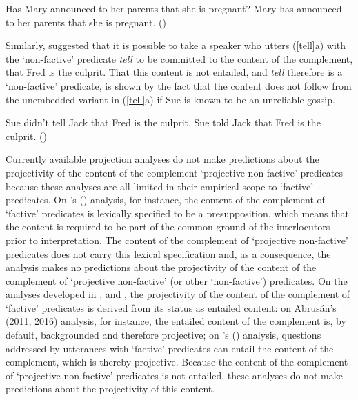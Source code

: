 \documentclass[11pt,fleqn]{article}
\newcommand{\6}{\mbox{$[\hspace*{-.6mm}[$}}
\newcommand{\9}{\mbox{$]\hspace*{-.6mm}]$}}
\newcommand{\citetpos}[1]{\citeauthor{#1}'s (\citeyear{#1})}
\begin{document}
\begin{exe}
\ex\label{announce2} 
\begin{xlist}
\ex Has Mary announced to her parents that she is pregnant? 
\ex Mary has announced to her parents that she is pregnant. \hfill (\citealt[139]{schlenker10})
\end{xlist}
\end{exe}
Similarly, \citet{spector-egre2015} suggested that it is possible to take a speaker who utters (\ref{tell}a) with the `non-factive' predicate {\em tell}  to be committed to the content of the complement, that Fred is the culprit. That this content is not entailed, and {\em tell} therefore is a `non-factive' predicate, is shown by the fact that the content does not follow from the unembedded variant in (\ref{tell}a) if Sue is known to be an unreliable gossip.

\begin{exe}
\ex\label{tell}
\begin{xlist}
\ex Sue didn't tell Jack that Fred is the culprit. 
\ex Sue told Jack that Fred is the culprit. \hfill (\citealt[1739]{spector-egre2015})
\end{xlist}
\end{exe}

Currently available projection analyses do not make predictions about the projectivity of the content of the complement `projective non-factive' predicates because these analyses are all limited in their empirical scope to `factive' predicates. On \citetpos{heim83} analysis, for instance, the content of the complement of `factive' predicates is lexically specified to be a presupposition, which means that the content is required to be part of the common ground of the interlocutors prior to interpretation. The content of the complement of `projective non-factive' predicates does not carry this lexical specification and, as a consequence, the analysis makes no predictions about the projectivity of the content of the complement of `projective non-factive' (or other `non-factive') predicates. On the analyses developed in \citealt{abrusan2011,abrusan2016}, \citealt{romoli2015} and \citealt{best-question}, the projectivity of the content of the complement of `factive' predicates is derived from its status as entailed content: on Abrus\'an's (2011, 2016) analysis, for instance, the entailed content of the complement is, by default, backgrounded and therefore projective; on \citetpos{best-question} analysis, questions addressed by utterances with `factive' predicates can entail the content of the complement, which is thereby projective. Because the content of the complement of  `projective non-factive' predicates is not entailed, these analyses do not make predictions about the projectivity of this content. 
\end{document}

